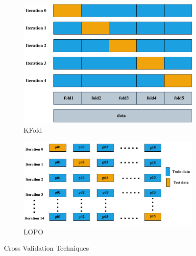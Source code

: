 \begin{figure}[h]
  \centering
  \hspace*{-2cm} %
  \begin{subfigure}[b]{0.50\columnwidth} %
      \includegraphics[width=\textwidth]{images/kfold.drawio.pdf}
      \caption{KFold}
      \label{fig:phone1}
  \end{subfigure}
  \hspace{0.05\columnwidth} %
  \begin{subfigure}[b]{0.65\columnwidth}
      \includegraphics[width=\textwidth]{images/Copy of lopo.pdf}
      \caption{LOPO}
      \label{fig:phone2}
  \end{subfigure}
  \caption{Cross Validation Techniques}
  \label{fig:CROSSVAL}
\end{figure}

